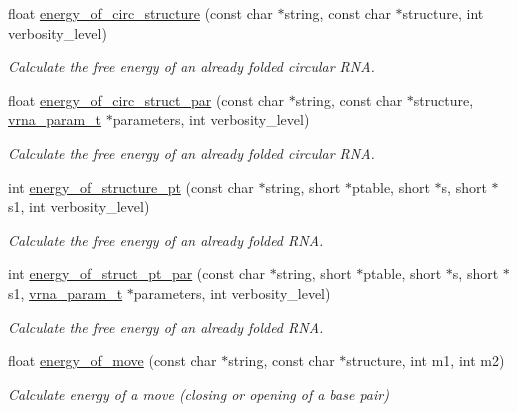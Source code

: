 \begin{DoxyCompactItemize}
float \hyperlink{group__eval_gaeb14f3664aec67fc03268ac75253f0f8}{energy\-\_\-of\-\_\-circ\-\_\-structure} (const char $\ast$string, const char $\ast$structure, int verbosity\-\_\-level)
\begin{DoxyCompactList}\small\item\em Calculate the free energy of an already folded circular R\-N\-A. \end{DoxyCompactList}\item 
float \hyperlink{group__eval_ga3f01f9744ba6a40555eb4d81fc77f6df}{energy\-\_\-of\-\_\-circ\-\_\-struct\-\_\-par} (const char $\ast$string, const char $\ast$structure, \hyperlink{group__energy__parameters_ga8a69ca7d787e4fd6079914f5343a1f35}{vrna\-\_\-param\-\_\-t} $\ast$parameters, int verbosity\-\_\-level)
\begin{DoxyCompactList}\small\item\em Calculate the free energy of an already folded circular R\-N\-A. \end{DoxyCompactList}\item 
int \hyperlink{group__eval_ga8831445966b761417e713360791299d8}{energy\-\_\-of\-\_\-structure\-\_\-pt} (const char $\ast$string, short $\ast$ptable, short $\ast$s, short $\ast$s1, int verbosity\-\_\-level)
\begin{DoxyCompactList}\small\item\em Calculate the free energy of an already folded R\-N\-A. \end{DoxyCompactList}\item 
int \hyperlink{group__eval_ga49acb3d5627dc6823a7ce12d116d4c69}{energy\-\_\-of\-\_\-struct\-\_\-pt\-\_\-par} (const char $\ast$string, short $\ast$ptable, short $\ast$s, short $\ast$s1, \hyperlink{group__energy__parameters_ga8a69ca7d787e4fd6079914f5343a1f35}{vrna\-\_\-param\-\_\-t} $\ast$parameters, int verbosity\-\_\-level)
\begin{DoxyCompactList}\small\item\em Calculate the free energy of an already folded R\-N\-A. \end{DoxyCompactList}\item 
float \hyperlink{group__eval_ga539ecaed89730f7644c202f304d7529b}{energy\-\_\-of\-\_\-move} (const char $\ast$string, const char $\ast$structure, int m1, int m2)
\begin{DoxyCompactList}\small\item\em Calculate energy of a move (closing or opening of a base pair) \end{DoxyCompactList}\item 

\end{DoxyCompactItemize}
